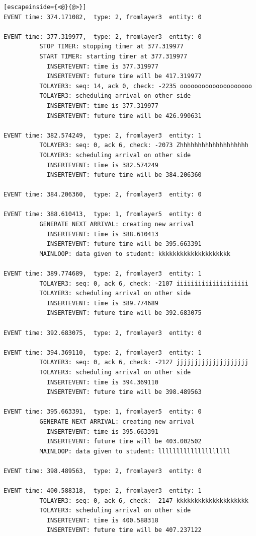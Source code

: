 \documentclass[paper=a4, fontsize=11pt]{scrartcl}
\numberwithin{equation}{section}		%
\numberwithin{figure}{section}			%
\numberwithin{table}{section}				%
\begin{document}
\begin{lstlisting}[escapeinside={<@}{@>}]
EVENT time: 374.171082,  type: 2, fromlayer3  entity: 0

EVENT time: 377.319977,  type: 2, fromlayer3  entity: 0
          STOP TIMER: stopping timer at 377.319977
          START TIMER: starting timer at 377.319977
            INSERTEVENT: time is 377.319977
            INSERTEVENT: future time will be 417.319977
          TOLAYER3: seq: 14, ack 0, check: -2235 oooooooooooooooooooo
          TOLAYER3: scheduling arrival on other side
            INSERTEVENT: time is 377.319977
            INSERTEVENT: future time will be 426.990631

EVENT time: 382.574249,  type: 2, fromlayer3  entity: 1
          TOLAYER3: seq: 0, ack 6, check: -2073 Zhhhhhhhhhhhhhhhhhhh
          TOLAYER3: scheduling arrival on other side
            INSERTEVENT: time is 382.574249
            INSERTEVENT: future time will be 384.206360

EVENT time: 384.206360,  type: 2, fromlayer3  entity: 0

EVENT time: 388.610413,  type: 1, fromlayer5  entity: 0
          GENERATE NEXT ARRIVAL: creating new arrival
            INSERTEVENT: time is 388.610413
            INSERTEVENT: future time will be 395.663391
          MAINLOOP: data given to student: kkkkkkkkkkkkkkkkkkkk

EVENT time: 389.774689,  type: 2, fromlayer3  entity: 1
          TOLAYER3: seq: 0, ack 6, check: -2107 iiiiiiiiiiiiiiiiiiii
          TOLAYER3: scheduling arrival on other side
            INSERTEVENT: time is 389.774689
            INSERTEVENT: future time will be 392.683075

EVENT time: 392.683075,  type: 2, fromlayer3  entity: 0

EVENT time: 394.369110,  type: 2, fromlayer3  entity: 1
          TOLAYER3: seq: 0, ack 6, check: -2127 jjjjjjjjjjjjjjjjjjjj
          TOLAYER3: scheduling arrival on other side
            INSERTEVENT: time is 394.369110
            INSERTEVENT: future time will be 398.489563

EVENT time: 395.663391,  type: 1, fromlayer5  entity: 0
          GENERATE NEXT ARRIVAL: creating new arrival
            INSERTEVENT: time is 395.663391
            INSERTEVENT: future time will be 403.002502
          MAINLOOP: data given to student: llllllllllllllllllll

EVENT time: 398.489563,  type: 2, fromlayer3  entity: 0

EVENT time: 400.588318,  type: 2, fromlayer3  entity: 1
          TOLAYER3: seq: 0, ack 6, check: -2147 kkkkkkkkkkkkkkkkkkkk
          TOLAYER3: scheduling arrival on other side
            INSERTEVENT: time is 400.588318
            INSERTEVENT: future time will be 407.237122


\end{lstlisting}
\end{document}
